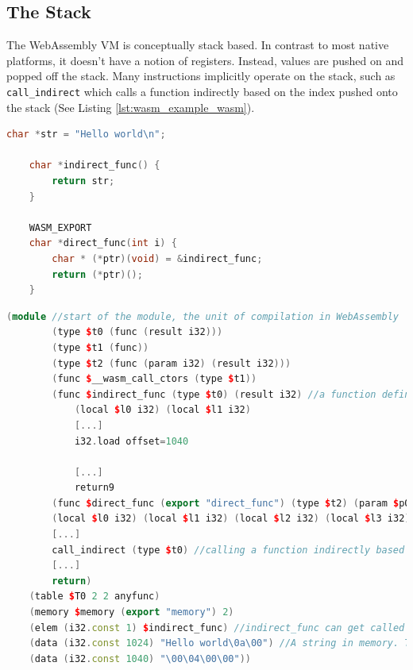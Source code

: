 \documentclass[sigconf]{acmart}
\begin{document}
\subsection{The Stack}
\label{sec:wasm_stack}
The WebAssembly VM is conceptually stack based. In contrast to most native platforms, it doesn't have a notion of registers. Instead, values are pushed on and popped off the stack. Many instructions implicitly operate on the stack, such as \texttt{call\_indirect} which calls a function indirectly based on the index pushed onto the stack (See Listing \ref{lst:wasm_example_wasm}).

\begin{lstlisting}[language=C++, caption={A C program which, when compiled without optimizations, gets translated to the code in Listing \ref{lst:wasm_example_wasm}.}, label=lst:wasm_example_c]
	char *str = "Hello world\n";

	char *indirect_func() {
		return str;
	}

	WASM_EXPORT
	char *direct_func(int i) { 
		char * (*ptr)(void) = &indirect_func;
		return (*ptr)();
	} 
\end{lstlisting}

\begin{lstlisting}[language=C++, caption={An example of a WebAssembly program in the human-readable \texttt{wat} format. The C program in Listing \ref{lst:wasm_example_c} gets compiled to this WebAssembly program (with uninteresting parts removed). Observe the indirect call, function table and memory region.}, label={lst:wasm_example_wasm}]
	(module //start of the module, the unit of compilation in WebAssembly
		(type $t0 (func (result i32)))
		(type $t1 (func))
		(type $t2 (func (param i32) (result i32)))
		(func $__wasm_call_ctors (type $t1))
		(func $indirect_func (type $t0) (result i32) //a function definition
			(local $l0 i32) (local $l1 i32)
			[...]
			i32.load offset=1040
			
			[...]
			return9
		(func $direct_func (export "direct_func") (type $t2) (param $p0 i32) (result i32)
		(local $l0 i32) (local $l1 i32) (local $l2 i32) (local $l3 i32) (local $l4 i32) (local $l5 i32) (local $l6 i32) (local $l7 i32)
		[...]
		call_indirect (type $t0) //calling a function indirectly based on the index pushed onto the stack
		[...]
		return)
	(table $T0 2 2 anyfunc)
	(memory $memory (export "memory") 2) 
	(elem (i32.const 1) $indirect_func) //indirect_func can get called indirectly by pushing '1' onto the stack 
	(data (i32.const 1024) "Hello world\0a\00") //A string in memory. There exists no constant storage in WebAssembly.
	(data (i32.const 1040) "\00\04\00\00"))
\end{lstlisting}
\end{document}
